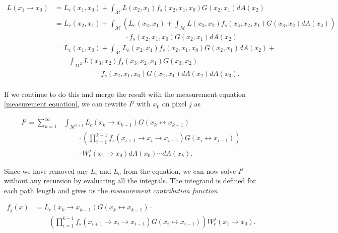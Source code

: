 \begin{align*}
L(x_1\rightarrow x_0) &= L_e(x_1,x_0) + \int_\mathcal{M}L(x_2, x_1) f_s(x_2, x_1,  x_0) G(x_2, x_1) dA(x_2)\\
&=  L_e(x_2, x_1) + \int_\mathcal{M}\left( L_e(x_2,x_1) + \int_\mathcal{M}L(x_3 , x_2) f_s(x_3 , x_2, x_1) G(x_3 , x_2) dA(x_3) \right)\\ 
&\qquad\qquad\qquad\qquad\qquad \cdot  f_s(x_2,x_1, x_0) G(x_2, x_1) dA(x_2)\\
&= L_e(x_1,x_0) + \int_\mathcal{M}L_e(x_2 , x_1) f_s(x_2 , x_1, x_0) G(x_2,x_1) dA(x_2) +\\
&\qquad \int_{\mathcal{M}^2}L(x_3 , x_2) f_s(x_3, x_2, x_1) G(x_3 ,x_2)\\
&\qquad\qquad\qquad \cdot f_s(x_2, x_1 , x_0) G(x_2 , x_1) dA(x_2)dA(x_3).\\
\end{align*}

If we continue to do this and merge the result with the measurement equation \ref{measurement equation}, we can rewrite $I^j$ with $x_0$ on pixel $j$ as

\begin{equation*}
\begin{split}
I^j=\sum_{k=1}^\infty &\int_{\mathcal{M}^{k+1}}L_e(x_k \rightarrow x_{k-1})G(x_k \leftrightarrow x_{k-1}) \\
&\qquad\cdot\left(  \prod_{i=1}^{k-1} f_s(x_{i+1} \rightarrow x_i \rightarrow x_{i-1}) G(x_i \leftrightarrow x_{i-1}) \right)\\
&\qquad\cdot W_e^j(x_1 \rightarrow x_0) dA(x_0) \cdots dA(x_k).
\end{split}
\end{equation*}


Since we have removed any $L_i$ and $L_o$ from the equation, we can now solve $I^j$ without any recursion by evaluating all the integrals. The integrand is defined for each path length and gives us the \emph{measurement contribution function}

\begin{equation}
\label{mcf}
\begin{split}
f_j(x) &= L_e(x_k \rightarrow x_{k-1}) G(x_k \leftrightarrow x_{k-1}) \cdot\\
& \qquad \left( \prod_{i = 1}^{k-1} f_s(x_{i+1} \rightarrow x_i \rightarrow x_{i-1}) G(x_{i} \leftrightarrow x_{i-1}) \right) W_e^j(x_1 \rightarrow x_0).
\end{split}
\end{equation}

